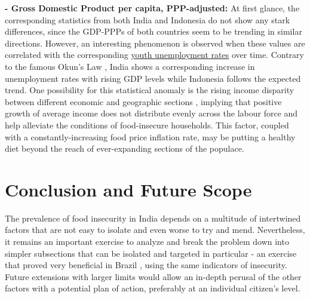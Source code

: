 \documentclass{article}
\begin{document}
\textbf{- Gross Domestic Product per capita, PPP-adjusted:} At first glance, the corresponding statistics from both India and Indonesia do not show any stark differences, since the GDP-PPPs of both countries seem to be trending in similar directions. However, an interesting phenomenon is observed when these values are correlated with the corresponding \href{https://data.worldbank.org/indicator/SL.UEM.TOTL.ZS}{youth unemployment rates} over time. Contrary to the famous Okun's Law \cite{okunlaw}, India shows a corresponding increase in unemployment rates with rising GDP levels while Indonesia follows the expected trend. One possibility for this statistical anomaly is the rising income disparity between different economic and geographic sections \cite{india_disparity}, implying that positive growth of average income does not distribute evenly across the labour force and help alleviate the conditions of food-insecure households. This factor, coupled with a constantly-increasing food price inflation rate, may be putting a healthy diet beyond the reach of ever-expanding sections of the populace.

\section{Conclusion and Future Scope}

The prevalence of food insecurity in India depends on a multitude of intertwined factors that are not easy to isolate and even worse to try and mend. Nevertheless, it remains an important exercise to analyze and break the problem down into simpler subsections that can be isolated and targeted in particular - an exercise that proved very beneficial in Brazil \cite{brazil}, using the same indicators of insecurity. Future extensions with larger limits would allow an in-depth perusal of the other factors with a potential plan of action, preferably at an individual citizen's level.

{
\small

}
\end{document}
